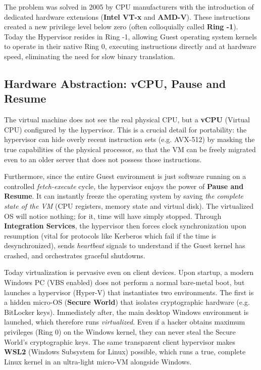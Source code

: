 The problem was solved in 2005 by CPU manufacturers with the introduction of dedicated hardware extensions (\textbf{Intel VT-x} and \textbf{AMD-V}). These instructions created a new privilege level below zero (often colloquially called \textbf{Ring -1}). Today the Hypervisor resides in Ring -1, allowing Guest operating system kernels to operate in their native Ring 0, executing instructions directly and at hardware speed, eliminating the need for slow binary translation.

\subsection{Hardware Abstraction: vCPU, Pause and Resume}
The virtual machine does not see the real physical CPU, but a \textbf{vCPU} (Virtual CPU) configured by the hypervisor. This is a crucial detail for portability: the hypervisor can hide overly recent instruction sets (e.g. AVX-512) by masking the true capabilities of the physical processor, so that the VM can be freely migrated even to an older server that does not possess those instructions. 

Furthermore, since the entire Guest environment is just software running on a controlled \textit{fetch-execute} cycle, the hypervisor enjoys the power of \textbf{Pause and Resume}. It can instantly freeze the operating system by saving \textit{the complete state of the VM} (CPU registers, memory state and virtual disk). The virtualized OS will notice nothing; for it, time will have simply stopped. 
Through \textbf{Integration Services}, the hypervisor then forces clock synchronization upon resumption (vital for protocols like Kerberos which fail if the time is desynchronized), sends \textit{heartbeat} signals to understand if the Guest kernel has crashed, and orchestrates graceful shutdowns.

\begin{tipbox}
Today virtualization is pervasive even on client devices. Upon startup, a modern Windows PC (VBS enabled) does not perform a normal bare-metal boot, but launches a hypervisor (Hyper-V) that instantiates two environments. The first is a hidden micro-OS (\textbf{Secure World}) that isolates cryptographic hardware (e.g. BitLocker keys). Immediately after, the main desktop Windows environment is launched, which therefore runs \textit{virtualized}. Even if a hacker obtains maximum privileges (Ring 0) on the Windows kernel, they can never steal the Secure World's cryptographic keys.
The same transparent client hypervisor makes \textbf{WSL2} (Windows Subsystem for Linux) possible, which runs a true, complete Linux kernel in an ultra-light micro-VM alongside Windows.
\end{tipbox}

